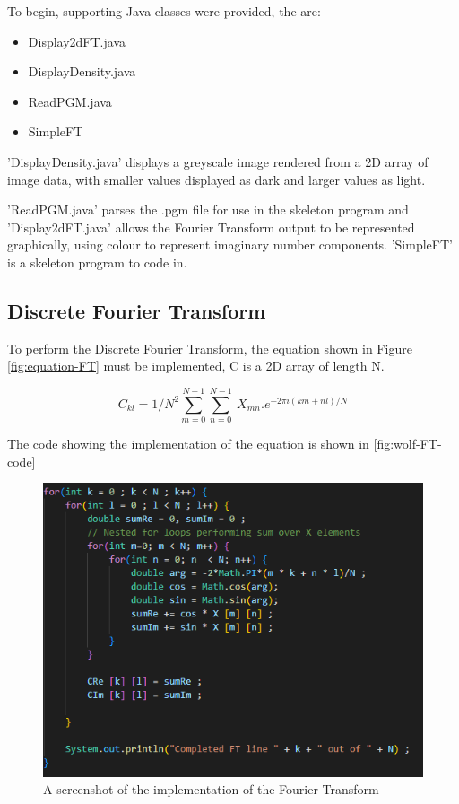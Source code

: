     To begin, supporting Java classes were provided, the are: 
    \begin{itemize}
        \item Display2dFT.java
        \item DisplayDensity.java
        \item ReadPGM.java
        \item SimpleFT  
    \end{itemize}
        
    'DisplayDensity.java' displays a greyscale image rendered from a 2D array of image data, with smaller values displayed as dark and larger values as light.
    
    'ReadPGM.java' parses the .pgm file for use in the skeleton program and 'Display2dFT.java' allows the Fourier Transform output to be represented graphically, using colour to represent imaginary number components. 'SimpleFT' is a skeleton program to code in.
    

    
    \subsection{Discrete Fourier Transform}
    To perform the Discrete Fourier Transform, the equation shown in Figure \autoref{fig:equation-FT} must be implemented, C is a 2D array of length N.
    \begin{center}
        \begin{equation}
            C_{kl} = 1/N^2 \sum_{m=0}^{N-1} \sum_{n=0}^{N-1}\ X_{mn} . e^{-2\pi i(km+nl)/N}
            \label{fig:equation-FT}
        \end{equation}  
    \end{center}%

    The code showing the implementation of the equation is shown in \autoref{fig:wolf-FT-code}
  


    \begin{figure}[H]
        \centering
        \includegraphics[width=1\columnwidth]{Figures/Week 1/W1-SimpleFT-Completed-For-Loop.png}
        \caption{A screenshot of the implementation of the Fourier Transform}
        \label{fig:wolf-FT-code}
    \end{figure}
    
